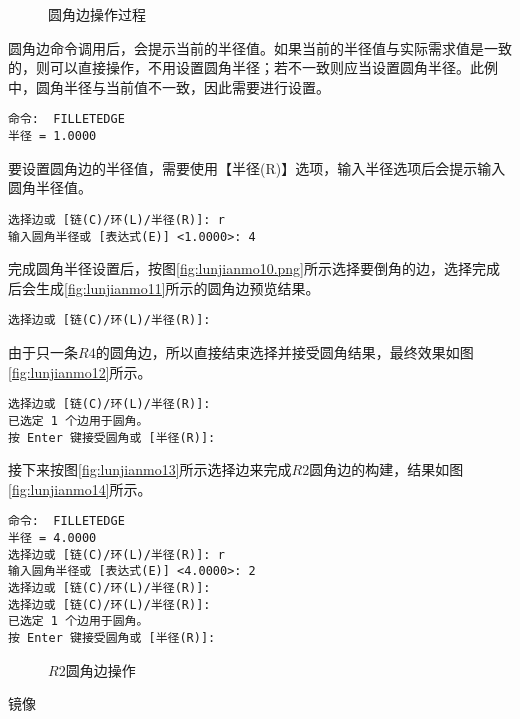 \begin{procedure}
\begin{figure}[htbp]
\centering
{}\hspace{20pt}
\hspace{20pt}
\caption{圆角边操作过程}
\end{figure}

圆角边命令调用后，会提示当前的半径值。如果当前的半径值与实际需求值是一致的，则可以直接操作，不用设置圆角半径；若不一致则应当设置圆角半径。此例中，圆角半径与当前值不一致，因此需要进行设置。
\begin{lstlisting}
命令:  FILLETEDGE
半径 = 1.0000
\end{lstlisting}

要设置圆角边的半径值，需要使用【半径(R)】选项，输入半径选项后会提示输入圆角半径值。
\begin{lstlisting}
选择边或 [链(C)/环(L)/半径(R)]: r
输入圆角半径或 [表达式(E)] <1.0000>: 4
\end{lstlisting}

完成圆角半径设置后，按图\ref{fig:lunjianmo10.png}所示选择要倒角的边，选择完成后会生成\ref{fig:lunjianmo11}所示的圆角边预览结果。
\begin{lstlisting}
选择边或 [链(C)/环(L)/半径(R)]:
\end{lstlisting}

由于只一条$R4$的圆角边，所以直接结束选择并接受圆角结果，最终效果如图\ref{fig:lunjianmo12}所示。
\begin{lstlisting}
选择边或 [链(C)/环(L)/半径(R)]:
已选定 1 个边用于圆角。
按 Enter 键接受圆角或 [半径(R)]:
\end{lstlisting}

接下来按图\ref{fig:lunjianmo13}所示选择边来完成$R2$圆角边的构建，结果如图\ref{fig:lunjianmo14}所示。
\begin{lstlisting}
命令:  FILLETEDGE
半径 = 4.0000
选择边或 [链(C)/环(L)/半径(R)]: r
输入圆角半径或 [表达式(E)] <4.0000>: 2
选择边或 [链(C)/环(L)/半径(R)]:
选择边或 [链(C)/环(L)/半径(R)]:
已选定 1 个边用于圆角。
按 Enter 键接受圆角或 [半径(R)]:
\end{lstlisting}

\begin{figure}[htbp]
\centering
{}\hspace{40pt}
\caption{$R2$圆角边操作}
\end{figure}
\item 镜像


\end{procedure}
